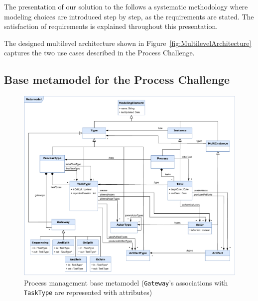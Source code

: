 
The presentation of our solution to the \mlpc follows a systematic methodology where modeling choices are introduced step by step, as the requirements are stated. The satisfaction of requirements is explained throughout this presentation.


The designed multilevel architecture shown in Figure~\ref{fig:MultilevelArchitecture} captures the two use cases described in the Process Challenge.


\subsection{Base metamodel for the Process Challenge}

\begin{figure}
 \centering
    \includegraphics[width=1.0 \textwidth]{Figures/Metamodel.pdf}
     \caption{Process management base metamodel (\texttt{Gateway}'s associations with \texttt{TaskType} are represented with attributes)}
    \label{fig:BaseMetamodel}
\end{figure}

